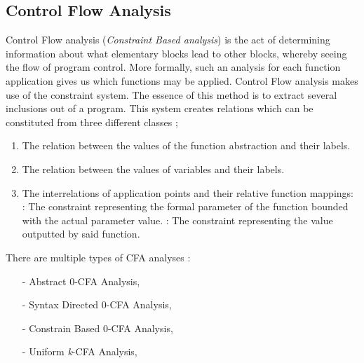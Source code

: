 {	\par {}
	\par {}
	
		\subsection{Control Flow Analysis}
		\label{subsec:cfa}
		\par Control Flow analysis (\textit{Constraint Based analysis}) is the act of determining information about what elementary blocks lead to other blocks, whereby seeing the flow of program control. More formally, such an analysis for each 
		function application gives us which functions may be applied. Control Flow analysis makes use of the constraint system. The essence of this method is to extract several inclusions out of a program. This system creates relations which can be 
		constituted from three different classes \cite[pp.10--13]{nielson2004principlesofPA};
		\begin{enumerate}
			\item The relation between the values of the function abstraction and their labels.
			\item The relation between the values of variables and their labels.
			\item The interrelations of application points and their relative function mappings:
				: The constraint representing the formal parameter of the function bounded with the actual parameter value.
				: The constraint representing the value outputted by said function.
		\end{enumerate}
		\par There are multiple types of CFA analyses \cite[pp.139--195]{nielson2004principlesofPA}:
		\begin{itemize}
			\item[-] Abstract 0-CFA Analysis,
			\item[-] Syntax Directed 0-CFA Analysis,
			\item[-] Constrain Based 0-CFA Analysis,
			\item[-] Uniform \textit{k}-CFA Analysis,
		\end{itemize}
		
}
